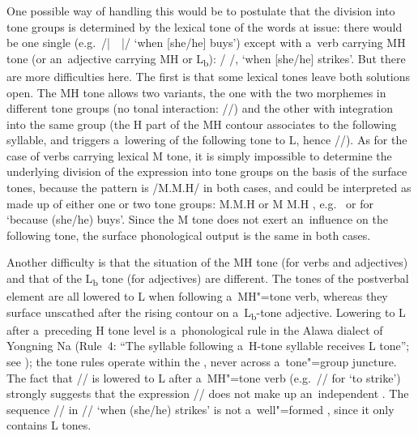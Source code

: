 One possible way of handling this would be to postulate that the division into tone groups is
determined by the lexical tone of the words at issue: there would be one single  (e.g.~/{\kern2pt}|{\kern2pt}~~{\kern2pt}|{\kern2pt}/ ‘when [she/he] buys’) except with a~verb carrying MH tone (or an~adjective carrying MH or L\textsubscript{b}): \mbox{/} /, ‘when [she/he] strikes’. But there are more difficulties here. The first is that some lexical tones leave both solutions open. The MH tone allows two variants, the one with the two morphemes in different tone groups (no tonal interaction: //) and the other with integration into the same group (the H part of the MH contour associates to the following syllable, and triggers a~lowering of the following tone to L, hence //). As for the case of verbs carrying lexical M tone, it is simply impossible to determine the underlying division of the expression into tone groups on the basis of the surface tones, because the pattern is /M.M.H/ in both cases, and could be interpreted as made up of either one or two tone groups: \ipa{{\kern2pt}|{\kern2pt}}M.M.H\ipa{{\kern2pt}|{\kern2pt}} or \ipa{{\kern2pt}|{\kern2pt}} M \ipa{{\kern2pt}|{\kern2pt}} M.H \ipa{{\kern2pt}|}, e.g.~ or  for ‘because (she/he) buys’. Since the M tone does not exert an~influence on the following tone, the surface phonological output is the same in both cases. 

Another difficulty is that the situation of the MH tone (for verbs and adjectives) and that of the L\textsubscript{b} tone (for adjectives) are different. The tones
of the postverbal element are all lowered to L when following a~MH"=tone verb, whereas they surface unscathed after the rising contour on a~L\textsubscript{b}-tone adjective. Lowering to L after
a~preceding H tone level is a~{phonological rule} in the Alawa dialect of Yongning Na (Rule~4: “The syllable following a~H-tone syllable receives L tone”; see ); the tone rules operate within the , never across
a~tone"=group juncture. The fact that // is lowered to L
after a~MH"=tone verb (e.g.~// for ‘to strike’) strongly suggests that the
expression // does not make up an~independent . The sequence
// in // ‘when (she/he) strikes’ is not
a~well"=formed , since it only contains L tones.

